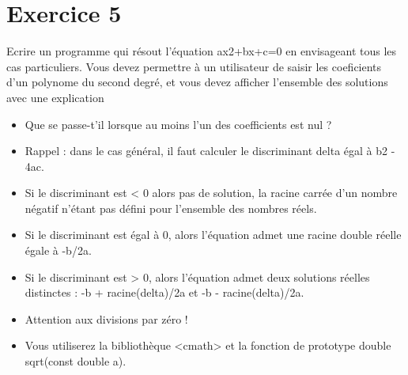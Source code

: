 \documentclass{article}
\begin{document}
	\section*{Exercice 5}		
		Ecrire un programme qui résout l’équation ax2+bx+c=0 en envisageant tous les cas particuliers. Vous devez permettre à un utilisateur de saisir les coeficients d'un polynome du second degré, et vous 
		devez afficher l'ensemble des solutions avec une explication
		\begin{itemize}
			\item Que se passe-t'il lorsque au moins l'un des coefficients est nul ?
			\item Rappel : dans le cas général, il faut calculer le discriminant delta égal à b2 - 4ac. 
			\item Si le discriminant est < 0 alors pas de solution, la racine carrée d'un nombre négatif n'étant pas défini pour l'ensemble des nombres réels. 
			\item Si le discriminant est égal à 0, alors l'équation admet une racine double réelle égale à -b/2a.
			\item Si le discriminant est > 0, alors l'équation admet deux solutions réelles distinctes : -b + racine(delta)/2a et -b - racine(delta)/2a.
			\item Attention aux divisions par zéro !
			\item Vous utiliserez la bibliothèque <cmath> et la fonction de prototype double sqrt(const double a).									

		\end{itemize}		
\end{document}
